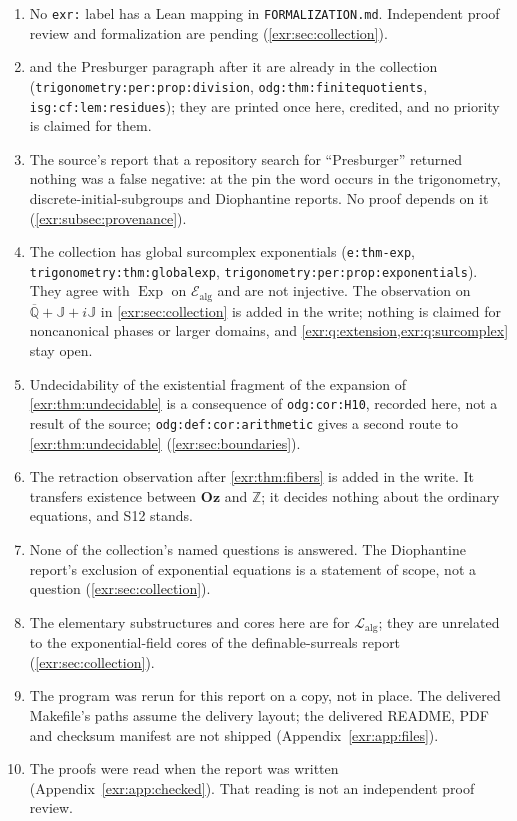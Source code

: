 \documentclass[11pt,letterpaper]{article}
\numberwithin{equation}{section}
\theoremstyle{definition}
\theoremstyle{remark}
\newcommand{\Oz}{\mathbf{Oz}}
\newcommand{\Z}{\mathbb Z}
\newcommand{\Qb}{\overline{\mathbb Q}}
\newcommand{\J}{\mathbb J}
\newcommand{\Ealg}{\mathcal E_{\mathrm{alg}}}
\newcommand{\Lalg}{\mathcal L_{\mathrm{alg}}}
\newcommand{\Exp}{\operatorname{Exp}}
\newcommand{\rpath}[1]{\nolinkurl{#1}}%
\newcommand{\lbl}[1]{\nolinkurl{#1}}%
\begin{document}
\begin{enumerate}[label=W\arabic*.,leftmargin=2.6em,itemsep=2pt]
\item No \texttt{exr:} label has a Lean mapping in \rpath{FORMALIZATION.md}.
Independent proof review and formalization are pending
(\cref{exr:sec:collection}).
\item {} and the Presburger paragraph after it are
already in the collection (\lbl{trigonometry:per:prop:division},
\lbl{odg:thm:finitequotients}, \lbl{isg:cf:lem:residues}); they are printed
once here, credited, and no priority is claimed for them.
\item The source's report that a repository search for ``Presburger''
returned nothing was a false negative: at the pin the word occurs in the
trigonometry, discrete-initial-subgroups and Diophantine reports. No proof
depends on it (\cref{exr:subsec:provenance}).
\item The collection has global surcomplex exponentials (\lbl{e:thm-exp},
\lbl{trigonometry:thm:globalexp}, \lbl{trigonometry:per:prop:exponentials}).
They agree with $\Exp$ on $\Ealg$ and are not injective. The observation on
$\Qb+\J+i\J$ in \cref{exr:sec:collection} is added in the write; nothing is
claimed for noncanonical phases or larger domains, and
\cref{exr:q:extension,exr:q:surcomplex} stay open.
\item Undecidability of the existential fragment of the expansion of
\cref{exr:thm:undecidable} is a consequence of \lbl{odg:cor:H10}, recorded
here, not a result of the source; \lbl{odg:def:cor:arithmetic} gives a second
route to \cref{exr:thm:undecidable} (\cref{exr:sec:boundaries}).
\item The retraction observation after \cref{exr:thm:fibers} is added in the
write. It transfers existence between $\Oz$ and $\Z$; it decides nothing
about the ordinary equations, and S12 stands.
\item None of the collection's named questions is answered. The Diophantine
report's exclusion of exponential equations is a statement of scope, not a
question (\cref{exr:sec:collection}).
\item The elementary substructures and cores here are for $\Lalg$; they are
unrelated to the exponential-field cores of the definable-surreals report
(\cref{exr:sec:collection}).
\item The program was rerun for this report on a copy, not in place. The
delivered Makefile's paths assume the delivery layout; the delivered README,
PDF and checksum manifest are not shipped
(Appendix~\ref{exr:app:files}).
\item The proofs were read when the report was written
(Appendix~\ref{exr:app:checked}). That reading is not an independent proof
review.
\end{enumerate}
\end{document}
